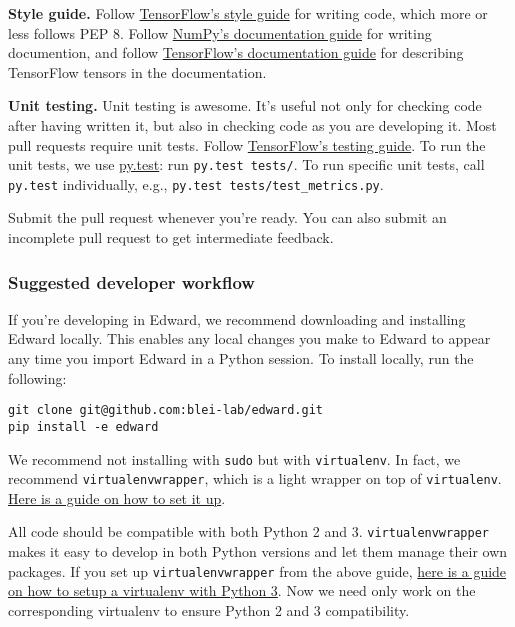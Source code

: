 \textbf{Style guide.}
Follow
\href{https://www.tensorflow.org/versions/master/how_tos/style_guide.html}{TensorFlow's
style guide}
for writing code, which more or less follows PEP 8.
Follow
\href{https://github.com/numpy/numpy/blob/master/doc/HOWTO_DOCUMENT.rst.txt}
{NumPy's documentation guide}
for writing documention,
and follow
\href{https://www.tensorflow.org/versions/master/how_tos/documentation/index.html}{TensorFlow's documentation guide}
for describing TensorFlow tensors in the documentation.

\textbf{Unit testing.}
Unit testing is awesome. It's useful not only
for checking code after having written it, but also in checking code
as you are developing it.
Most pull requests require unit tests.
Follow
\href{https://www.tensorflow.org/versions/master/api_docs/python/test.html}
{TensorFlow's testing guide}.
To run the unit tests, we use
\href{http://doc.pytest.org/}{py.test}:
run \texttt{py.test tests/}.
To run specific unit tests, call \texttt{py.test} individually, e.g., \texttt{py.test tests/test_metrics.py}.

Submit the pull request whenever you're ready. You can also submit an
incomplete pull request to get intermediate feedback.

\subsubsection{Suggested developer workflow}\label{suggested-workflow}

If you're developing in Edward,
we recommend downloading and installing Edward locally. This enables
any local changes you make to Edward to appear any time you
import Edward in a Python session. To install locally, run the
following:

\begin{verbatim}
git clone git@github.com:blei-lab/edward.git
pip install -e edward
\end{verbatim}

We recommend not installing with \texttt{sudo} but with
\texttt{virtualenv}. In fact, we recommend
\texttt{virtualenvwrapper}, which is a light wrapper on top of
\texttt{virtualenv}.
\href{http://docs.python-guide.org/en/latest/starting/install/osx/}
{Here is a guide on how to set it up}.

All code should be compatible with both Python 2 and 3.
\texttt{virtualenvwrapper} makes it easy to develop in both Python versions
and let them manage their own packages.
If you set up \texttt{virtualenvwrapper} from the above guide,
\href{http://www.marinamele.com/2014/07/install-python3-on-mac-os-x-and-use-virtualenv-and-virtualenvwrapper.html}
{here is a guide on how to setup a virtualenv with Python 3}.
Now we need only work on the corresponding virtualenv to ensure Python
2 and 3 compatibility.


